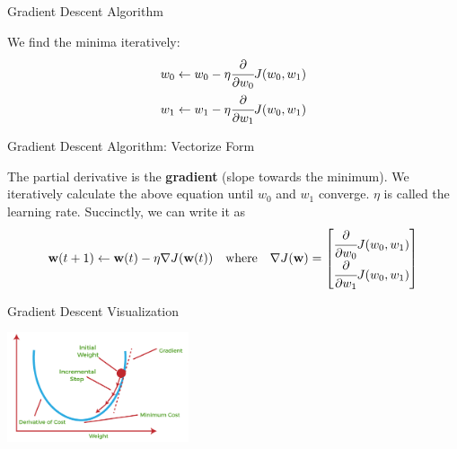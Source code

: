 \documentclass[aspectratio=169,xcolor=dvipsnames,svgnames,x11names,fleqn]{beamer}
\begin{document}
\begin{frame}{Gradient Descent Algorithm}
\begin{talert}{}
We find the minima iteratively:
\begin{equation}
    \begin{aligned}
        w_0 & \leftarrow w_0 - \eta \cfrac{\partial }{\partial w_0}J(w_0, w_1)\\
        w_1 & \leftarrow w_1 - \eta \cfrac{\partial }{\partial w_1}J(w_0, w_1)
    \end{aligned}
\end{equation}
\end{talert}
\end{frame}

\begin{frame}{Gradient Descent Algorithm: Vectorize Form}
\begin{talert}{}
    The partial derivative is the \textbf{gradient} (slope towards the minimum). 
    We iteratively calculate the above equation until $w_0$ and $w_1$ converge. $\eta$ is called the learning rate.  Succinctly, we can write it as 
    \begin{equation}
        {\mathbf w}(t+1) \leftarrow {\mathbf w}(t) - \eta\nabla J({\mathbf w}(t)) \quad \textrm{where}\quad \nabla J({\mathbf w}) = \begin{bmatrix}
        \cfrac{\partial }{\partial w_0}J(w_0, w_1) \\ \cfrac{\partial }{\partial w_1}J(w_0, w_1)
    \end{bmatrix}
    \end{equation}
    \end{talert}
\end{frame}

\begin{frame}{Gradient Descent Visualization}
\begin{center}
    \includegraphics[width=0.40\textwidth]{figures/gradient-descent-2D.png}
\end{center}

\end{frame}
\end{document}
